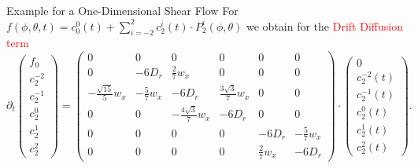 \begin{frame}{Example for a One-Dimensional Shear Flow}
	\scriptsize
	For  $f(\phi, \theta, t) = c^0_0(t) + \sum_{i=-2}^{2} c^i_{2}(t) \cdot P^i_{2}(\phi, \theta)$ we obtain for the \textcolor{red}{Drift Diffusion term} \\
	
	\begin{equation*}
		\partial_t \left(\begin{array}{c}
			f_0 \\
			c_2^{-2} \\
			c_2^{-1} \\
			c_2^0 \\
			c_2^1 \\
			c_2^2
		\end{array}\right)  = \begin{pmatrix}
			0 & 0 & 0 & 0 & 0 & 0 \\
			0 & -6D_r & \frac{2}{7}w_x & 0 & 0 & 0 \\
			-\frac{\sqrt{15}}{5}w_x & -\frac{5}{7}w_x & -6D_r & \frac{3\sqrt{3}}{7}w_x & 0 & 0 \\
			0 & 0 & -\frac{4\sqrt{3}}{7}w_x & -6D_r & 0 & 0 \\
			0 & 0 & 0 & 0 & -6D_r & -\frac{5}{7} w_x\\
			0 & 0 & 0 & 0 & \frac{2}{7}w_x & -6D_r
		\end{pmatrix} \cdot
		\left(\begin{array}{c}
			0 \\
			c^{-2}_2(t) \\
			c_2^{-1}(t) \\
			c_2^0(t) \\
			c_2^1(t) \\
			c_2^2(t)
		\end{array}\right).
	\end{equation*}
\end{frame}

